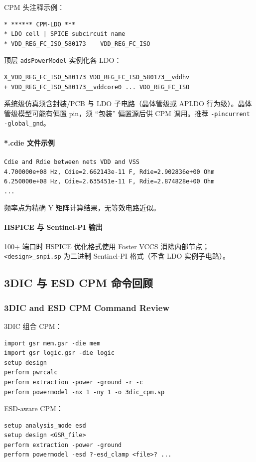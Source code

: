 CPM 头注释示例：
\begin{lstlisting}
* ****** CPM-LDO ***
* LDO cell | SPICE subcircuit name
* VDD_REG_FC_ISO_580173    VDD_REG_FC_ISO
\end{lstlisting}

顶层 \texttt{adsPowerModel} 实例化各 LDO：
\begin{lstlisting}
X_VDD_REG_FC_ISO_580173 VDD_REG_FC_ISO_580173__vddhv
+ VDD_REG_FC_ISO_580173__vddcore0 ... VDD_REG_FC_ISO
\end{lstlisting}

系统级仿真须含封装/PCB 与 LDO 子电路（晶体管级或 APLDO 行为级）。晶体管级模型可能有偏置 pin，须 ``包装'' 偏置源后供 CPM 调用。推荐 \texttt{-pincurrent -global\_gnd}。

\paragraph{*.cdie 文件示例}
\begin{lstlisting}
Cdie and Rdie between nets VDD and VSS
4.700000e+08 Hz, Cdie=2.662143e-11 F, Rdie=2.902836e+00 Ohm
6.250000e+08 Hz, Cdie=2.635451e-11 F, Rdie=2.874828e+00 Ohm
...
\end{lstlisting}
频率点为精确 Y 矩阵计算结果，无等效电路近似。

\paragraph{HSPICE 与 Sentinel-PI 输出}
100+ 端口时 HSPICE 优化格式使用 Foster VCCS 消除内部节点；\texttt{<design>\_snpi.sp} 为二进制 Sentinel-PI 格式（不含 LDO 实例子电路）。

\subsection{3DIC 与 ESD CPM 命令回顾}
\subsubsection*{3DIC and ESD CPM Command Review}

3DIC 组合 CPM：
\begin{lstlisting}
import gsr mem.gsr -die mem
import gsr logic.gsr -die logic
setup design
perform pwrcalc
perform extraction -power -ground -r -c
perform powermodel -nx 1 -ny 1 -o 3dic_cpm.sp
\end{lstlisting}

ESD-aware CPM：
\begin{lstlisting}
setup analysis_mode esd
setup design <GSR_file>
perform extraction -power -ground
perform powermodel -esd ?-esd_clamp <file>? ...
\end{lstlisting}


